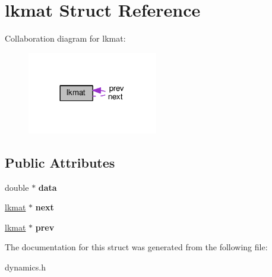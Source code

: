 \hypertarget{structlkmat}{}\section{lkmat Struct Reference}
\label{structlkmat}


Collaboration diagram for lkmat\+:
\nopagebreak
\begin{figure}[H]
\begin{center}
\leavevmode
\includegraphics[width=161pt]{structlkmat__coll__graph}
\end{center}
\end{figure}
\subsection*{Public Attributes}
\begin{DoxyCompactItemize}
\item 
double $\ast$ {\bfseries data}\hypertarget{structlkmat_aea97f7471828c4d0738681e08d1863f0}{}\label{structlkmat_aea97f7471828c4d0738681e08d1863f0}

\item 
\hyperlink{structlkmat}{lkmat} $\ast$ {\bfseries next}\hypertarget{structlkmat_aaf3f72f9eda076e7b7cc86b395238cd1}{}\label{structlkmat_aaf3f72f9eda076e7b7cc86b395238cd1}

\item 
\hyperlink{structlkmat}{lkmat} $\ast$ {\bfseries prev}\hypertarget{structlkmat_a0e7089d34a889da926b5ae8437d2dd6d}{}\label{structlkmat_a0e7089d34a889da926b5ae8437d2dd6d}

\end{DoxyCompactItemize}


The documentation for this struct was generated from the following file\+:\begin{DoxyCompactItemize}
\item 
dynamics.\+h\end{DoxyCompactItemize}
